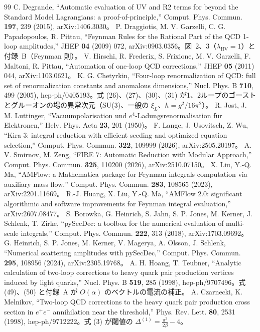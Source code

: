 \documentclass[a4paper,10pt]{ltjsarticle}
\begin{document}
\begin{thebibliography}{99}
 C. Degrande, ``Automatic evaluation of UV and R2 terms for beyond the Standard Model Lagrangians: a proof-of-principle,'' Comput. Phys. Commun. \textbf{197}, 239 (2015), arXiv:1406.3030。
 P. Draggiotis, M. V. Garzelli, C. G. Papadopoulos, R. Pittau, ``Feynman Rules for the Rational Part of the QCD 1-loop amplitudes,'' JHEP \textbf{04} (2009) 072, arXiv:0903.0356。図~2、3（$\lambda_{\mathrm{HV}}=1$）と付録~B（Feynman 則）。
 V. Hirschi, R. Frederix, S. Frixione, M. V. Garzelli, F. Maltoni, R. Pittau, ``Automation of one-loop QCD corrections,'' JHEP \textbf{05} (2011) 044, arXiv:1103.0621。
 K. G. Chetyrkin, ``Four-loop renormalization of QCD: full set of renormalization constants and anomalous dimensions,'' Nucl. Phys. B \textbf{710}, 499 (2005), hep-ph/0405193。式 (26)、(27)、(30)、(31) が1、2ループのゴーストとグルーオンの場の異常次元（SU(3)、一般の $\xi_L$、$h=g^2/16\pi^2$）。
 R. Jost, J. M. Luttinger, ``Vacuumpolarisation und $e^4$-Ladungsrenormalisation für Elektronen,'' Helv. Phys. Acta \textbf{23}, 201 (1950)。
 F. Lange, J. Usovitsch, Z. Wu, ``Kira 3: integral reduction with efficient seeding and optimized equation selection,'' Comput. Phys. Commun. \textbf{322}, 109999 (2026), arXiv:2505.20197。
 A. V. Smirnov, M. Zeng, ``FIRE 7: Automatic Reduction with Modular Approach,'' Comput. Phys. Commun. \textbf{325}, 110200 (2026), arXiv:2510.07150。
 X. Liu, Y.-Q. Ma, ``AMFlow: a Mathematica package for Feynman integrals computation via auxiliary mass flow,'' Comput. Phys. Commun. \textbf{283}, 108565 (2023), arXiv:2201.11669。
 R.-J. Huang, X. Liu, Y.-Q. Ma, ``AMFlow 2.0: significant algorithmic and software improvements for Feynman integral evaluation,'' arXiv:2607.08477。
 S. Borowka, G. Heinrich, S. Jahn, S. P. Jones, M. Kerner, J. Schlenk, T. Zirke, ``pySecDec: a toolbox for the numerical evaluation of multi-scale integrals,'' Comput. Phys. Commun. \textbf{222}, 313 (2018), arXiv:1703.09692。
 G. Heinrich, S. P. Jones, M. Kerner, V. Magerya, A. Olsson, J. Schlenk, ``Numerical scattering amplitudes with pySecDec,'' Comput. Phys. Commun. \textbf{295}, 108956 (2024), arXiv:2305.19768。
 A. H. Hoang, T. Teubner, ``Analytic calculation of two-loop corrections to heavy quark pair production vertices induced by light quarks,'' Nucl. Phys. B \textbf{519}, 285 (1998), hep-ph/9707496。式 (49)、(50) と付録~A が $O(\alpha)$ のベクトルの電流の補正。
 A. Czarnecki, K. Melnikov, ``Two-loop QCD corrections to the heavy quark pair production cross section in $e^+e^-$ annihilation near the threshold,'' Phys. Rev. Lett. \textbf{80}, 2531 (1998), hep-ph/9712222。式 (3) が閾値の $\Delta^{(1)}=\frac{\pi^2}{2\beta}-4$。

\end{thebibliography}
\end{document}
